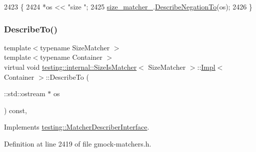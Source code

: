\begin{DoxyCode}
2423                                                           \{
2424       *os << \textcolor{stringliteral}{"size "};
2425       \hyperlink{classtesting_1_1internal_1_1SizeIsMatcher_1_1Impl_a47227c64c6261eb2bc5a69e2ed9ac921}{size\_matcher\_}.\hyperlink{classtesting_1_1internal_1_1MatcherBase_ac1089d49b6b8a381900618985cd69b7f}{DescribeNegationTo}(os);
2426     \}
\end{DoxyCode}
\mbox{\label{classtesting_1_1internal_1_1SizeIsMatcher_1_1Impl_a6b2524886e5fa751e96495a74d75b7cd}} 
\subsubsection{\texorpdfstring{Describe\+To()}{DescribeTo()}}
{\footnotesize\ttfamily template$<$typename Size\+Matcher $>$ \\
template$<$typename Container $>$ \\
virtual void \hyperlink{classtesting_1_1internal_1_1SizeIsMatcher}{testing\+::internal\+::\+Size\+Is\+Matcher}$<$ Size\+Matcher $>$\+::\hyperlink{classtesting_1_1internal_1_1SizeIsMatcher_1_1Impl}{Impl}$<$ Container $>$\+::Describe\+To (\begin{DoxyParamCaption}\item[{\+::std\+::ostream $\ast$}]{os }\end{DoxyParamCaption}) const\hspace{0.3cm}{\ttfamily [inline]}, {\ttfamily [virtual]}}



Implements \hyperlink{classtesting_1_1MatcherDescriberInterface_ad9f861588bd969b6e3e717f13bb94e7b}{testing\+::\+Matcher\+Describer\+Interface}.



Definition at line 2419 of file gmock-\/matchers.\+h.


